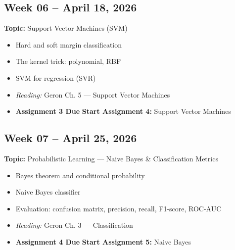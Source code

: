 \documentclass[
  10pt,
]{article}
\providecommand{\tightlist}{%
  \setlength{\itemsep}{0pt}\setlength{\parskip}{0pt}}
\newenvironment{blackbox}{%
  \def\FrameCommand{%
    \hspace{1pt}%
    {\color{boxborder}\vrule width 2pt}%
    {\color{boxbg}\vrule width 4pt}%
    \colorbox{boxbg}%
  }%
  \MakeFramed{\advance\hsize-\width\FrameRestore}%
  \noindent\ignorespaces
}{%
  \endMakeFramed
}
\begin{document}
\begin{blackbox}

\begin{center}

\subsection{Week 06 -- April 18, 2026}\label{week-06-april-18-2026}

\end{center}

\textbf{Topic:} Support Vector Machines (SVM)

\begin{itemize}
\tightlist
\item
  Hard and soft margin classification
\item
  The kernel trick: polynomial, RBF
\item
  SVM for regression (SVR)
\item
  \emph{Reading:} Geron Ch. 5 --- Support Vector Machines
\item
  \textbf{Assignment 3 Due} \textbar{} \textbf{Start Assignment 4:}
  Support Vector Machines
\end{itemize}

\end{blackbox}

\begin{blackbox}

\begin{center}

\subsection{Week 07 -- April 25, 2026}\label{week-07-april-25-2026}

\end{center}

\textbf{Topic:} Probabilistic Learning --- Naive Bayes \& Classification
Metrics

\begin{itemize}
\tightlist
\item
  Bayes theorem and conditional probability
\item
  Naive Bayes classifier
\item
  Evaluation: confusion matrix, precision, recall, F1-score, ROC-AUC
\item
  \emph{Reading:} Geron Ch. 3 --- Classification
\item
  \textbf{Assignment 4 Due} \textbar{} \textbf{Start Assignment 5:}
  Naive Bayes
\end{itemize}

\end{blackbox}
\end{document}
